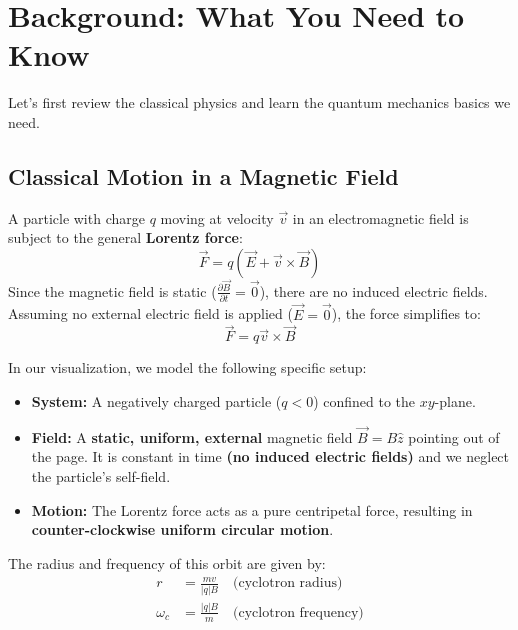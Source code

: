 \documentclass[11pt,a4paper]{article}
\let\oldsection\section
\renewcommand{\section}{\needspace{5\baselineskip}\oldsection}
\let\oldsubsection\subsection
\renewcommand{\subsection}{\needspace{4\baselineskip}\oldsubsection}
\theoremstyle{definition}
\theoremstyle{remark}
\begin{document}
\section{Background: What You Need to Know}

Let's first review the classical physics and learn the quantum mechanics basics we need.

\subsection{Classical Motion in a Magnetic Field}

A particle with charge $q$ moving at velocity $\vec{v}$ in an electromagnetic field is subject to the general \textbf{Lorentz force}:
\begin{equation}
    \vec{F} = q(\vec{E} + \vec{v} \times \vec{B})
\end{equation}
Since the magnetic field is static ($\frac{\partial \vec{B}}{\partial t} = \vec{0}$), there are no induced electric fields. Assuming no external electric field is applied ($\vec{E} = \vec{0}$), the force simplifies to:
\begin{equation}
    \vec{F} = q\vec{v} \times \vec{B}
\end{equation}

In our visualization, we model the following specific setup:
\begin{itemize}
    \item[-] \textbf{System:} A negatively charged particle ($q < 0$) confined to the $xy$-plane.
    \item[-] \textbf{Field:} A \textbf{static, uniform, external} magnetic field $\vec{B} = B\hat{z}$ pointing out of the page. It is constant in time \textbf{(no induced electric fields)} and we neglect the particle's self-field.
    \item[-] \textbf{Motion:} The Lorentz force acts as a pure centripetal force, resulting in \textbf{counter-clockwise uniform circular motion}.
\end{itemize}

The radius and frequency of this orbit are given by:
\begin{align}
    r &= \frac{mv}{|q|B} \quad \text{(cyclotron radius)} \\
    \omega_c &= \frac{|q|B}{m} \quad \text{(cyclotron frequency)}
\end{align}
\end{document}
